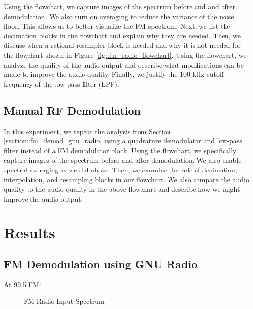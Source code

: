\documentclass{article}
\begin{document}
Using the flowchart, we capture images of the spectrum before and and after demodulation. We also turn on averaging to reduce the variance of the noise floor. This allows us to better visualize the FM spectrum. Next, we list the decimation blocks in the flowchart and explain why they are needed. Then, we discuss when a rational resampler block is needed and why it is not needed for the flowchart shown in Figure \ref{fig::fm_radio_flowchart}. Using the flowchart, we analyze the quality of the audio output and describe what modifications can be made to improve the audio quality. Finally, we justify the 100 kHz cutoff frequency of the low-pass filter (LPF).

\subsection{Manual RF Demodulation}

In this experiment, we repeat the analysis from Section \ref{section::fm_demod_gnu_radio} using a quadrature demodulator and low-pass filter instead of a FM demodulator block. Using the flowchart, we specifically capture images of the spectrum before and after demodulation. We also enable spectral averaging as we did above. Then, we examine the role of decimation, interpolation, and resampling blocks in our flowchart. We also compare the audio quality to the audio quality in the above flowchart and describe how we might improve the audio output.

\section{Results}

\subsection{FM Demodulation using GNU Radio}

At 99.5 FM:

\begin{figure}[H]
	\centerline{}
	\caption{FM Radio Input Spectrum}
	\label{fig::fm_radio_input_spectrum}
\end{figure}
\end{document}
